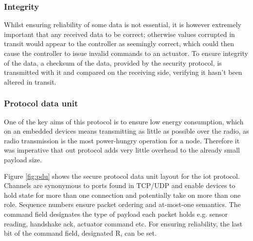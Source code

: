 \documentclass[conference]{./sty/IEEEtran}
\begin{document}
\subsubsection*{Integrity} %
\label{ssub:integrity}
Whilst ensuring reliability of some data is not essential, it is however extremely important that any received data to be correct; otherwise values corrupted in transit would appear to the controller as seemingly correct, which could then cause the controller to issue invalid commands to an actuator. To ensure integrity of the data, a checksum of the data, provided by the security protocol, is transmitted with it and compared on the receiving side, verifying it hasn't been altered in transit.  

\subsubsection*{Protocol data unit} %
\label{ssub:protocol_data_unit}
One of the key aims of this protocol is to ensure low energy consumption, which on an embedded devices means transmitting as little as possible over the radio, as radio transmission is the most power-hungry operation for a node. Therefore it was imperative that out protocol adds very little overhead to the already small payload size.

Figure \ref{fig:pdu} shows the secure protocol data unit layout for the iot protocol. Channels are synonymous to ports found in TCP/UDP and enable devices to hold state for more than one connection and potentially take on more than one role. Sequence numbers ensure packet ordering and at-most-one semantics. The command field designates the type of payload each packet holds e.g. sensor reading, handshake ack, actuator command etc. For ensuring reliability, the last bit of the command field, designated R, can be set.
\end{document}
